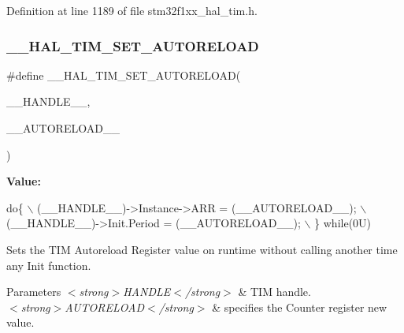 Definition at line 1189 of file stm32f1xx\+\_\+hal\+\_\+tim.\+h.

\mbox{\label{group___t_i_m___exported___macros_ga1e6300cab1e34ecaaf490dc7d4812d69}} 
\subsubsection{\texorpdfstring{\+\_\+\+\_\+\+H\+A\+L\+\_\+\+T\+I\+M\+\_\+\+S\+E\+T\+\_\+\+A\+U\+T\+O\+R\+E\+L\+O\+AD}{\_\_HAL\_TIM\_SET\_AUTORELOAD}}
{\footnotesize\ttfamily \#define \+\_\+\+\_\+\+H\+A\+L\+\_\+\+T\+I\+M\+\_\+\+S\+E\+T\+\_\+\+A\+U\+T\+O\+R\+E\+L\+O\+AD(\begin{DoxyParamCaption}\item[{}]{\+\_\+\+\_\+\+H\+A\+N\+D\+L\+E\+\_\+\+\_\+,  }\item[{}]{\+\_\+\+\_\+\+A\+U\+T\+O\+R\+E\+L\+O\+A\+D\+\_\+\+\_\+ }\end{DoxyParamCaption})}

{\bfseries Value\+:}
\begin{DoxyCode}
\textcolor{keywordflow}{do}\{                                                    \(\backslash\)
                              (\_\_HANDLE\_\_)->Instance->ARR = (\_\_AUTORELOAD\_\_);  \(\backslash\)
                              (\_\_HANDLE\_\_)->Init.Period = (\_\_AUTORELOAD\_\_);    \(\backslash\)
                          \} \textcolor{keywordflow}{while}(0U)
\end{DoxyCode}


Sets the T\+IM Autoreload Register value on runtime without calling another time any Init function. 


\begin{DoxyParams}{Parameters}
{\em $<$strong$>$\+H\+A\+N\+D\+L\+E$<$/strong$>$} & T\+IM handle. \\
\hline
{\em $<$strong$>$\+A\+U\+T\+O\+R\+E\+L\+O\+A\+D$<$/strong$>$} & specifies the Counter register new value. \\
\hline
\end{DoxyParams}

